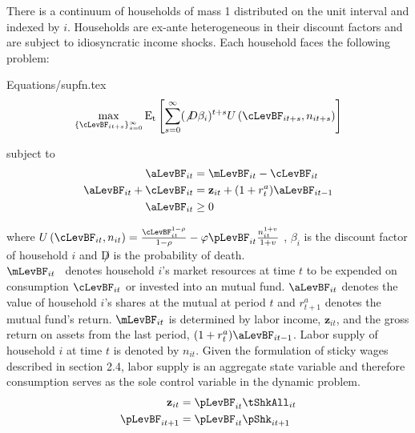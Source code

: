 \documentclass[titlepage]{\econtex}\providecommand{\texname}{BufferStockTheory}
\providecommand{\EqDir}{Equations}
\begin{document}
There is a continuum of households of mass 1 distributed on the unit
interval and indexed by $i$. Households are ex-ante heterogeneous in their discount factors and are subject to idiosyncratic income shocks.  Each household faces the following problem:

\begin{verbatimwrite}{\EqDir/supfn.tex}
\begin{eqnarray}
  \label{eq:supfn}
  \max_{\{\cLevBF_{it+s}\}_{s=0}^{\infty}} \mathrm{E_{t}}\left[\sum_{s=0}^{\infty} (\not D \beta_{i})^{t+s} U\left(  \cLevBF_{i t+s}, n_{i t+s}\right)\right]
\end{eqnarray}
\end{verbatimwrite}
 

subject to 
\begin{align*}
\aLevBF_{it}     &= \mLevBF_{it} - \cLevBF_{it}   \label{eq:DBCparts} \\
\aLevBF_{it} +\cLevBF_{it}    &= \mathbf{z}_{it} +   (1 + r^{a}_{t} ) \aLevBF_{it-1}   \\ 
\aLevBF_{it}  &\geq 0 \\
\end{align*}

where
$U\left(\cLevBF_{i t}, n_{i t}\right) = \frac{\cLevBF_{i t}^{1-\rho}}{1 -\rho} - \varphi \pLevBF_{it} \frac{n_{it}^{1+v}}{1+v}$ , $\beta_{i}$ is the discount factor of household $i$ and $\not D$ is the probability of death.  \\

$\mLevBF_{it}$ \ denotes household $i$'s market resources at time $t$ to be expended on consumption $\cLevBF_{it}$ or invested into an mutual fund.  $ \aLevBF_{it}$ denotes the value of household $i$'s shares at the mutual at period $t$ and $r_{t+1}^{a}$ denotes the mutual fund's return.  $\mLevBF_{it}$ is determined by labor income,  $\mathbf{z}_{it}$, and the gross return on assets from the last period, $(1+r_{t}^{a}) \aLevBF_{it-1} $. Labor supply of household $i$ at time $t$ is denoted by $n_{it}$.  Given the formulation of sticky wages described in section 2.4, labor supply is an aggregate state variable and therefore consumption serves as the sole control variable in the dynamic problem. \\




\begin{align*}
\mathbf{z}_{it} &= \pLevBF_{it}\tShkAll_{it} \\
\pLevBF_{it+1} &=\pLevBF_{it} \pShk_{it+1} \\
\end{align*}
\end{document}
